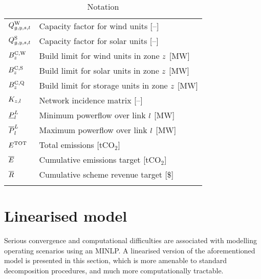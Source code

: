 \documentclass{article}
\begin{document}
\begin{longtable}{ p{}  p{}}
		$Q_{g,y,s,t}^{\mathrm{W}}$ & Capacity factor for wind units [--]\\
		$Q_{g,y,s,t}^{\mathrm{S}}$ & Capacity factor for solar units [--]\\
		$B^{\mathrm{C,\mathrm{W}}}_{z}$ & Build limit for wind units in zone $z$ [MW]\\
		$B^{\mathrm{C,\mathrm{S}}}_{z}$ & Build limit for solar units in zone $z$ [MW]\\
		$B^{\mathrm{C,\mathrm{Q}}}_{z}$ & Build limit for storage units in zone $z$ [MW]\\
		$K_{z,l}$ & Network incidence matrix [--]\\
		$\underline{P}_{l}^{L}$ & Minimum powerflow over link $l$ [MW]\\
		$\overline{P}_{l}^{L}$ & Maximum powerflow over link $l$ [MW]\\
		$E^{\mathrm{TOT}}$ & Total emissions [tCO$_{2}$]\\
		$\overline{E}$ & Cumulative emissions target [tCO$_{2}$]\\
		$\overline{R}$ & Cumulative scheme revenue target [\$]\\
		\hline
		\caption{Notation}
	\end{longtable}

\section{Linearised model}
Serious convergence and computational difficulties are associated with modelling operating scenarios using an MINLP. A linearised version of the aforementioned model is presented in this section, which is more amenable to standard decomposition procedures, and much more computationally tractable.
\end{document}

